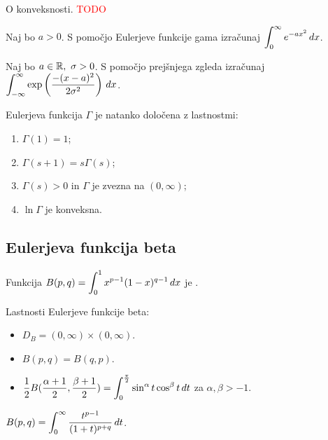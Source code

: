 \begin{opomba}
    O konveksnosti. \textcolor{red}{TODO}
\end{opomba}

\begin{zgled}
    Naj bo \(a>0\). S pomočjo Eulerjeve funkcije gama izračunaj \(\displaystyle \int_{0}^{\infty} e ^{-ax^2} \, dx\).
\end{zgled}

\begin{zgled}
    Naj bo \(a \in \mathbb{R}, \ \sigma > 0\). S pomočjo prejšnjega zgleda izračunaj \(\displaystyle \int_{-\infty}^{\infty} \exp \left(\frac{-(x-a)^2}{2\sigma^2}\right) \, dx\).
\end{zgled}

\begin{izrek}
    Eulerjeva funkcija \(\Gamma\) je natanko določena z lastnostmi:
    \begin{enumerate}
        \item \(\Gamma(1) = 1\);
        \item \(\Gamma(s+1) = s \Gamma(s)\);
        \item \(\Gamma(s)>0\) in \(\Gamma\) je zvezna na \((0, \infty)\);
        \item \(\ln \Gamma\) je konveksna.
    \end{enumerate}
\end{izrek}

\subsection{Eulerjeva funkcija beta}
\begin{definicija}
    Funkcija \(\displaystyle B(p,q) = \int_{0}^{1}x^{p-1}(1-x)^{q-1} \, dx\) je .
\end{definicija}

\begin{trditev}
    Lastnosti Eulerjeve funkcije beta:
    \begin{itemize}
        \item \(D_B = (0, \infty) \times (0, \infty)\).
        \item \(B(p,q) = B(q,p)\).
        \item \(\displaystyle \frac{1}{2} B(\frac{\alpha + 1}{2}, \frac{\beta + 1}{2}) = \int_{0}^{\frac{\pi}{2}} \sin^\alpha t \cos^\beta t \, dt\) za \(\alpha, \beta > -1\).
    \end{itemize}
\end{trditev}

\begin{trditev}
    \(\displaystyle B(p,q) = \int_{0}^{\infty} \frac{t^{p-1}}{(1+t)^{p+q}} \, dt\).
\end{trditev}

